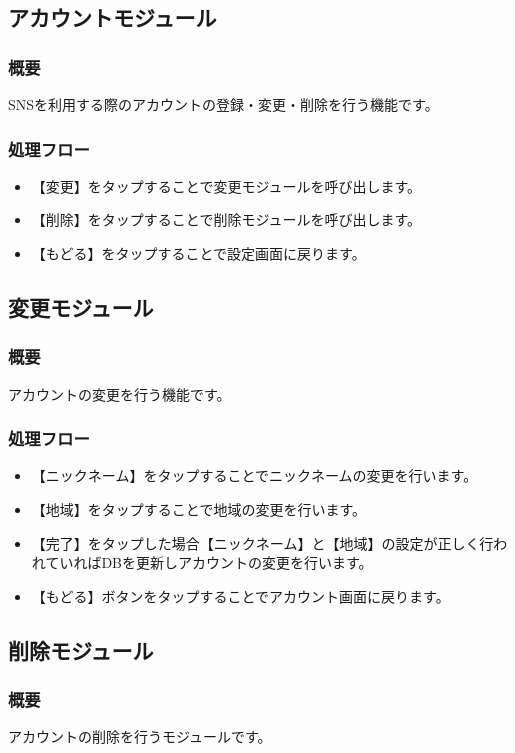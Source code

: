 \documentclass[a4j]{jarticle}
\begin{document}
\subsection{アカウントモジュール}
\subsubsection*{概要}SNSを利用する際のアカウントの登録・変更・削除を行う機能です。

\subsubsection*{処理フロー}
\begin{itemize}
\item 【変更】をタップすることで変更モジュールを呼び出します。
\item 【削除】をタップすることで削除モジュールを呼び出します。
\item 【もどる】をタップすることで設定画面に戻ります。
\end{itemize}

\subsection{変更モジュール}
\subsubsection*{概要}アカウントの変更を行う機能です。

\subsubsection*{処理フロー}
\begin{itemize}
\item 【ニックネーム】をタップすることでニックネームの変更を行います。
\item 【地域】をタップすることで地域の変更を行います。
\item 【完了】をタップした場合【ニックネーム】と【地域】の設定が正しく行われていればDBを更新しアカウントの変更を行います。
\item 【もどる】ボタンをタップすることでアカウント画面に戻ります。
\end{itemize}

\subsection{削除モジュール}
\subsubsection*{概要}アカウントの削除を行うモジュールです。
\end{document}
